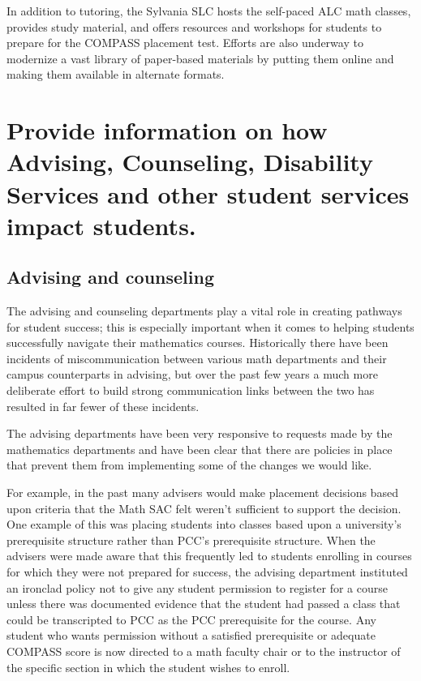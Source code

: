 In addition to tutoring, the Sylvania SLC hosts the self-paced ALC math
classes, provides study material, and offers resources and workshops for
students to prepare for the COMPASS placement test. Efforts are also underway
to modernize a vast library of paper-based materials by putting them online and
making them available in alternate formats.

\section{Provide information on how Advising, Counseling, Disability Services and other student services impact students. }
\subsection{Advising and counseling}
The advising and counseling departments play a vital role in creating pathways
for student success; this is especially important when it comes to helping
students successfully navigate their mathematics courses.  Historically there
have been incidents of miscommunication between various math departments and
their campus counterparts in advising, but over the past few years a much more
deliberate effort to build strong communication links  between the two has
resulted in far fewer of these incidents.

The advising departments have been very responsive to requests made by the
mathematics departments and have been clear that there are
policies in place that prevent them from implementing some of the changes we
would like.  

For example, in the past many advisers would make placement decisions based
upon criteria that the Math SAC felt weren't sufficient to support the
decision.   One example of this was placing students into classes based upon a
university's prerequisite structure rather than PCC's prerequisite structure.
When the advisers were made aware that this frequently led to students
enrolling in courses for which they were not prepared for success, the advising
department instituted an ironclad policy not to give any student permission to
register for a course unless there was documented evidence that the student had
passed a class that could be transcripted to PCC as the PCC prerequisite for
the course.  Any student who wants permission without a satisfied prerequisite
or adequate COMPASS score is now directed to a math faculty chair or to the
instructor of the specific section in which the student wishes to enroll.

